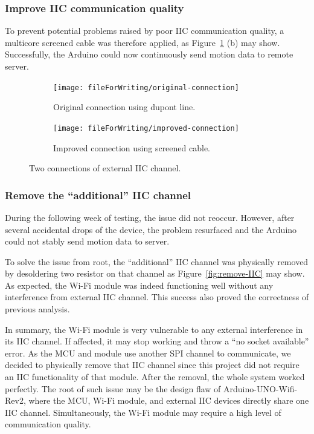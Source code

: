 \subsubsection{Improve IIC communication quality}

To prevent potential problems raised by poor IIC communication quality, a multicore screened cable was therefore applied, as Figure~\ref{fig:IIC-connections} (b) may show.
Successfully, the Arduino could now continuously send motion data to remote server.


\begin{figure}[htbp]
	\centering
	\begin{subfigure}[b]{0.45\textwidth}
		\centering
		\texttt{[image: fileForWriting/original-connection]}
		\caption{Original connection using dupont line.}
	\end{subfigure}
	\hfill
	\begin{subfigure}[b]{0.45\textwidth}
		\centering
		\texttt{[image: fileForWriting/improved-connection]}
		\caption{Improved connection using screened cable.}
	\end{subfigure}
	\caption[]{Two connections of external IIC channel.}
	\label{fig:IIC-connections}
\end{figure}

\subsubsection{Remove the ``additional'' IIC channel}
During the following week of testing, the issue did not reoccur.
However, after several accidental drops of the device, the problem resurfaced and the Arduino could not stably send motion data to server.

To solve the issue from root, the ``additional'' IIC channel was physically removed by desoldering two resistor on that channel as Figure~\ref{fig:remove-IIC} may show.
As expected, the Wi-Fi module was indeed functioning well without any interference from external IIC channel.
This success also proved the correctness of previous analysis.


In summary, the Wi-Fi module is very vulnerable to any external interference in its IIC channel.
If affected, it may stop working and throw a ``no socket available'' error.
As the MCU and module use another SPI channel to communicate, we decided to physically remove that IIC channel since this project did not require an IIC functionality of that module.
After the removal, the whole system worked perfectly.
The root of such issue may be the design flaw of Arduino-UNO-Wifi-Rev2, where the MCU, Wi-Fi module, and external IIC devices directly share one IIC channel.
Simultaneously, the Wi-Fi module may require a high level of communication quality.



